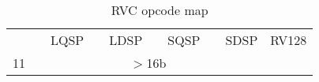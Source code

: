 \begin{table*}[htbp]
\begin{center}
{\begin{tabular}{|r|c|c|c|c|c|c|c|c|l}
                        &                           & LQSP  &                       & LDSP                          &                                & SQSP               &                       & SDSP                  & RV128 \\ \cline{1-9}
    \cellcolor{gray} 11  & \multicolumn{8}{c|}{\cellcolor{gray} $>$16b} \\ \cline{1-9}
 \end{tabular}
}
\end{center}
\vspace{-0.15in}
\caption{RVC opcode map}
\label{rvcopcodemap}
\end{table*}
